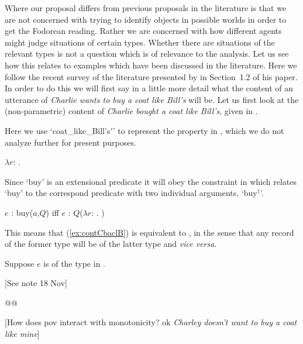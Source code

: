 Where our proposal differs from previous proposals in the literature
is that we are not concerned with trying to identify
objects in possible worlds in order to get the Fodorean reading.
Rather we are concerned with how different agents might judge
situations of certain types.  Whether there are situations of the
relevant types is not a question which is of relevance to the
analysis.  Let us see how this relates to examples which have been
discussed in the literature.  Here we follow the recent survey of the
literature presented by \cite{Prossms} in Section~1.2 of his paper.
In order to do this we will first say in a little more detail what the
content of an utterance of \textit{Charlie wants to buy a coat like
  Bill's} will be.  Let us first look at the (non-parametric) content of
\textit{Charlie bought a coat like Bill's}, given in \nexteg{}.
\begin{ex} 
\label{ex:contCbaclB} 
\end{ex} 
Here we use `coat\_like\_Bill's$'$' to represent the property in
\nexteg{}, which we do not analyze further for present purposes.
\begin{ex} 
$\lambda r$: .  
\end{ex} 
Since `buy' is an extensional predicate it will obey the constraint in
\nexteg{} which relates `buy' to the correspond predicate with two
individual arguments, `buy$^\dagger$'.
\begin{ex} 
$e$ : buy($a$,$Q$) iff $e$ : $Q$($\lambda
r$:
. ) 
\end{ex} 
This means that (\ref{ex:contCbaclB}) is equivalent to \nexteg{}, in
the sense that any record of the former type will be of the latter
type and \textit{vice versa}.
\begin{ex} 
\end{ex} 
Suppose $e$ is of the type in \nexteg{}.
\begin{ex} 
 
\end{ex} 
[See note 18 Nov]        
  

@@

[How does pov interact with monotonicity?  ok \textit{Charley doesn't want
to buy a coat like mine}]

